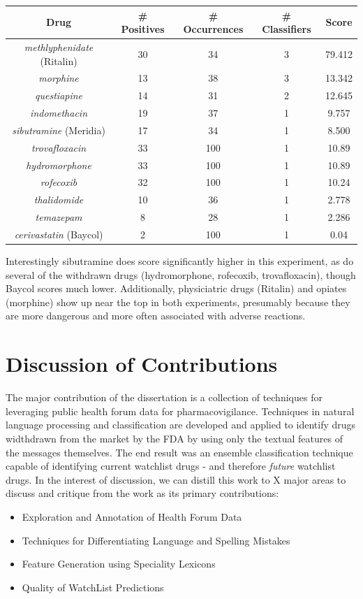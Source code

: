 \documentclass[twoside,11pt]{article}
\begin{document}
\begin{center}
  \begin{tabular}{||c c c c c||}
    \hline
    Drug & # Positives & # Occurrences & # Classifiers & Score \\
    \hline\hline
    \textit{methlyphenidate} (Ritalin) & 30 & 34 & 3 & 79.412 \\
    \hline
    \textit{morphine} & 13 & 38 & 3 & 13.342 \\
    \hline
    \textit{questiapine} & 14 & 31 & 2 & 12.645 \\
    \hline
    \textit{indomethacin} & 19 & 37 & 1 & 9.757 \\
    \hline
    \textit{sibutramine} (Meridia) & 17 & 34 & 1 & 8.500\\
    \hline\hline
    \textit{trovafloxacin} & 33 & 100 & 1 & 10.89\\
    \hline
    \textit{hydromorphone} & 33 & 100 & 1 & 10.89\\
    \hline
    \textit{rofecoxib} & 32 & 100 & 1 & 10.24 \\
    \hline
    \textit{thalidomide} & 10 & 36 & 1 & 2.778\\
    \hline
    \textit{temazepam} & 8 & 28 & 1 & 2.286\\
    \hline
    \textit{cerivastatin} (Baycol) & 2 & 100 & 1 & 0.04\\
  \end{tabular}
\end{center}
Interestingly sibutramine does score significantly higher in this experiment, as do several of the withdrawn drugs (hydromorphone, rofecoxib, trovafloxacin), though Baycol scores much lower. Additionally, physiciatric drugs (Ritalin) and opiates (morphine) show up near the top in both experiments, presumably because they are more dangerous and more often associated with adverse reactions.


\section{Discussion of Contributions}
The major contribution of the dissertation is a collection of techniques for leveraging public health forum data for pharmacovigilance. Techniques in natural language processing and classification are developed and applied to identify drugs widthdrawn from the market by the FDA by using only the textual features of the messages themselves. The end result was an ensemble classification technique capable of identifying current watchlist drugs - and therefore \textit{future} watchlist drugs.  In the interest of discussion, we can distill this work to X major areas to discuss and critique from the work as its primary contributions:
\begin{itemize}
  \item Exploration and Annotation of Health Forum Data
  \item Techniques for Differentiating Language and Spelling Mistakes
  \item Feature Generation using Speciality Lexicons
  \item Quality of WatchList Predictions
\end{itemize}
\end{document}

